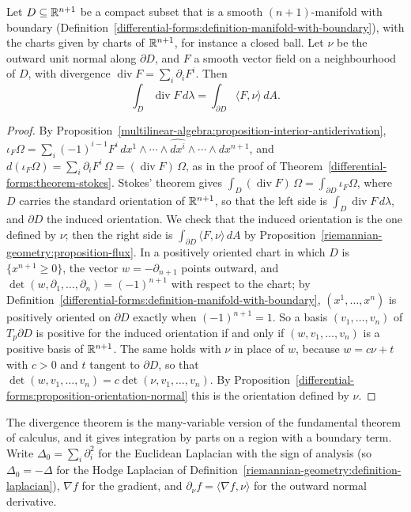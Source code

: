 \begin{corollary}\label{riemannian-geometry:corollary-divergence}
Let $D \subseteq \mathbb{R}^{n+1}$ be a compact subset that is a smooth $(n+1)$-manifold with boundary (Definition~\ref{differential-forms:definition-manifold-with-boundary}),
with the charts given by charts of $\mathbb{R}^{n+1}$, for instance a closed ball. Let $\nu$ be the outward unit normal along $\partial D$, and $F$ a smooth vector field on a
neighbourhood of $D$, with divergence $\operatorname{div}F = \sum_i\partial_iF^i$. Then
\[
\int_D\operatorname{div}F\,d\lambda = \int_{\partial D}\langle F, \nu\rangle\,dA .
\]
\end{corollary}

\begin{proof}
By Proposition~\ref{multilinear-algebra:proposition-interior-antiderivation},
$\iota_F\Omega = \sum_i(-1)^{i-1}F^i\,dx^1 \wedge \cdots \wedge \widehat{dx^i} \wedge \cdots \wedge dx^{n+1}$, and
$d(\iota_F\Omega) = \sum_i\partial_iF^i\,\Omega = (\operatorname{div}F)\,\Omega$, as in the proof of Theorem~\ref{differential-forms:theorem-stokes}. Stokes' theorem gives
$\int_D(\operatorname{div}F)\,\Omega = \int_{\partial D}\iota_F\Omega$, where $D$ carries the standard orientation of $\mathbb{R}^{n+1}$, so that the left side is
$\int_D\operatorname{div}F\,d\lambda$, and $\partial D$ the induced orientation. We check that the induced orientation is the one defined by $\nu$; then the right side is
$\int_{\partial D}\langle F, \nu\rangle\,dA$ by Proposition~\ref{riemannian-geometry:proposition-flux}. In a positively oriented chart in which $D$ is
$\{x^{n+1} \geq 0\}$, the vector $w = -\partial_{n+1}$ points outward, and $\det(w, \partial_1, \ldots, \partial_n) = (-1)^{n+1}$ with respect to the chart; by
Definition~\ref{differential-forms:definition-manifold-with-boundary}, $(x^1, \ldots, x^n)$ is positively oriented on $\partial D$ exactly when $(-1)^{n+1} = 1$. So a
basis $(v_1, \ldots, v_n)$ of $T_p\partial D$ is positive for the induced orientation if and only if $(w, v_1, \ldots, v_n)$ is a positive basis of $\mathbb{R}^{n+1}$. The same
holds with $\nu$ in place of $w$, because $w = c\nu + t$ with $c > 0$ and $t$ tangent to $\partial D$, so that $\det(w, v_1, \ldots, v_n) = c\det(\nu, v_1, \ldots, v_n)$.
By Proposition~\ref{differential-forms:proposition-orientation-normal} this is the orientation defined by $\nu$.
\end{proof}

The divergence theorem is the many-variable version of the fundamental theorem of calculus, and it gives integration by parts on a region with a boundary term. Write $\Delta_0 = \sum_i\partial_i^2$
for the Euclidean Laplacian with the sign of analysis (so $\Delta_0 = -\Delta$ for the Hodge Laplacian of Definition~\ref{riemannian-geometry:definition-laplacian}), $\nabla f$ for the gradient, and
$\partial_\nu f = \langle\nabla f, \nu\rangle$ for the outward normal derivative.

